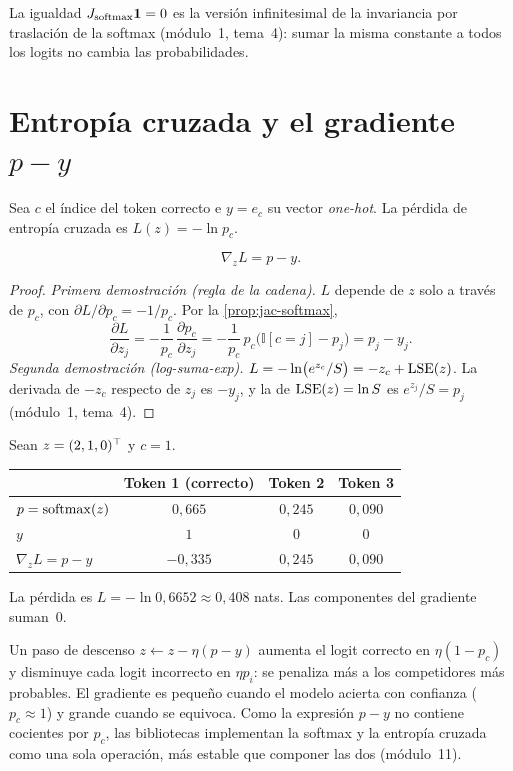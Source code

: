 La igualdad $J_{\operatorname{softmax}}\mathbf{1}=0$ es la versión infinitesimal de la invariancia por traslación de la softmax (módulo~1, tema~4): sumar la misma constante a todos los logits no cambia las probabilidades.

\section{Entropía cruzada y el gradiente \texorpdfstring{$p-y$}{p − y}}

Sea $c$ el índice del token correcto e $y=e_c$ su vector \emph{one-hot}. La pérdida de entropía cruzada es $L(z)=-\ln p_c$.

\begin{teorema}\label{teo:p-y}
\[
\nabla_z L=p-y.
\]
\end{teorema}

\begin{proof}
\emph{Primera demostración (regla de la cadena).} $L$ depende de $z$ solo a través de $p_c$, con $\partial L/\partial p_c=-1/p_c$. Por la \cref{prop:jac-softmax},
\[
\frac{\partial L}{\partial z_j}=-\frac{1}{p_c}\,\frac{\partial p_c}{\partial z_j}=-\frac{1}{p_c}\,p_c\bigl(\mathbb{I}[c=j]-p_j\bigr)=p_j-y_j.
\]
\emph{Segunda demostración (log-suma-exp).} $L=-\ln\bigl(e^{z_c}/S\bigr)=-z_c+\operatorname{LSE}(z)$. La derivada de $-z_c$ respecto de $z_j$ es $-y_j$, y la de $\operatorname{LSE}(z)=\ln S$ es $e^{z_j}/S=p_j$ (módulo~1, tema~4).
\end{proof}

\begin{ejemplo}\label{ej:p-y}
Sean $z=(2,1,0)^{\top}$ y $c=1$.
\begin{center}\small
\begin{tabular}{@{}lccc@{}}
\toprule
 & Token 1 (correcto) & Token 2 & Token 3 \\
\midrule
$p=\operatorname{softmax}(z)$ & $0{,}665$ & $0{,}245$ & $0{,}090$ \\
$y$ & $1$ & $0$ & $0$ \\
$\nabla_z L=p-y$ & $-0{,}335$ & $0{,}245$ & $0{,}090$ \\
\bottomrule
\end{tabular}
\end{center}
La pérdida es $L=-\ln 0{,}6652\approx 0{,}408$ nats. Las componentes del gradiente suman~0.
\end{ejemplo}

\begin{observacion}[Interpretación]
Un paso de descenso $z\leftarrow z-\eta(p-y)$ aumenta el logit correcto en $\eta(1-p_c)$ y disminuye cada logit incorrecto en $\eta p_i$: se penaliza más a los competidores más probables. El gradiente es pequeño cuando el modelo acierta con confianza ($p_c\approx 1$) y grande cuando se equivoca. Como la expresión $p-y$ no contiene cocientes por $p_c$, las bibliotecas implementan la softmax y la entropía cruzada como una sola operación, más estable que componer las dos (módulo~11).
\end{observacion}

